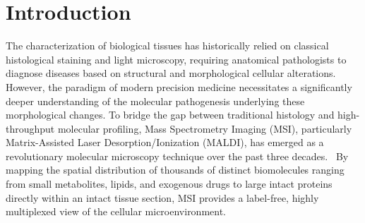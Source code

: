 \documentclass[
12pt, %
oneside, %
english, %
onehalfspacing, %
nolistspacing, %
headsepline, %
]{MastersDoctoralThesis} %
\begin{document}
\tableofcontents %





\mainmatter %
\pagestyle{thesis} %

%
% 
%
%
%
% 
%


\chapter{Introduction}

The characterization of biological tissues has historically relied on classical histological staining and light microscopy, requiring anatomical pathologists to diagnose diseases based on structural and morphological cellular alterations. However, the paradigm of modern precision medicine necessitates a significantly deeper understanding of the molecular pathogenesis underlying these morphological changes. To bridge the gap between traditional histology and high-throughput molecular profiling, Mass Spectrometry Imaging (MSI), particularly Matrix-Assisted Laser Desorption/Ionization (MALDI), has emerged as a revolutionary molecular microscopy technique over the past three decades.~\citep{schwamborn2010molecular} By mapping the spatial distribution of thousands of distinct biomolecules ranging from small metabolites, lipids, and exogenous drugs to large intact proteins directly within an intact tissue section, MSI provides a label-free, highly multiplexed view of the cellular microenvironment.~\citep{ye2013msi}
\end{document}
